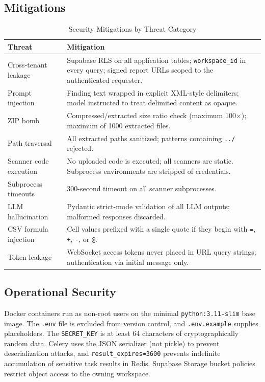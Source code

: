 \documentclass[conference]{IEEEtran}
\newcommand{\tsz}{\footnotesize}
\begin{document}
\subsection{Mitigations}
\begin{table}[!t]
\caption{Security Mitigations by Threat Category}
\label{tab:security}
\centering\tsz
\begin{tabularx}{\textwidth}{@{}lX@{}}
\toprule
\textbf{Threat} & \textbf{Mitigation}\\
\midrule
Cross-tenant leakage    & Supabase RLS on all application tables; \texttt{workspace\_id} in every query; signed report URLs scoped to the authenticated requester.\\
Prompt injection        & Finding text wrapped in explicit XML-style delimiters; model instructed to treat delimited content as opaque.\\
ZIP bomb                & Compressed/extracted size ratio check (maximum 100$\times$); maximum of 1000 extracted files.\\
Path traversal          & All extracted paths sanitized; patterns containing \texttt{../} rejected.\\
Scanner code execution  & No uploaded code is executed; all scanners are static. Subprocess environments are stripped of credentials.\\
Subprocess timeouts     & 300-second timeout on all scanner subprocesses.\\
LLM hallucination       & Pydantic strict-mode validation of all LLM outputs; malformed responses discarded.\\
CSV formula injection   & Cell values prefixed with a single quote if they begin with \texttt{=}, \texttt{+}, \texttt{-}, or \texttt{@}.\\
Token leakage           & WebSocket access tokens never placed in URL query strings; authentication via initial message only.\\
\bottomrule
\end{tabularx}
\end{table}

\subsection{Operational Security}
Docker containers run as non-root users on the minimal
\texttt{python:3.11-slim} base image. The \texttt{.env} file is excluded from
version control, and \texttt{.env.example} supplies placeholders. The
\texttt{SECRET\_KEY} is at least 64 characters of cryptographically random data.
Celery uses the JSON serializer (not pickle) to prevent deserialization attacks,
and \texttt{result\_expires=3600} prevents indefinite accumulation of sensitive
task results in Redis. Supabase Storage bucket policies restrict object access
to the owning workspace.
\end{document}
